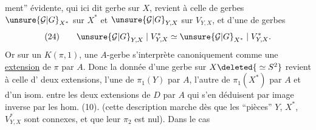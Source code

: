 ment'' évidente, qui ici dit 
 gerbe 
sur $X$, revient à celle de gerbes $\unsure{\mathcal G|G}_{X^*}$ sur
$X^*$ et $\unsure{\mathcal G|G}_{Y,X}$ sur $V_{Y,X}$, et d'une
 de  gerbes
\[
(24)\qquad \unsure{\mathcal G|G}_{Y,X}\mid V^*_{Y,X}\simeq
\unsure{\mathcal G|G}_{X^*}\mid V^*_{Y,X}.
\]
Or sur un $K(\pi,1)$, une $A$-gerbe
s'interprète canoniquement comme une
\uline{extension} de $\pi$ par $A$. Donc la donnée
d'une gerbe sur $X\deleted{{}\simeq S^2}$ revient à celle
d' deux extensions, l'une de
$\pi_1(Y)$ par $A$, l'autre de $\pi_1(X^*)$ par $A$
et d'un isom. entre les deux extensions
de $D$ par $A$ qui s'en déduisent
par image inverse par les hom. (10).
(cette description marche dès que les
``pièces'' $Y$, $X^*$, $V^*_{Y,X}$ sont connexes, et
que leur $\pi_2$ est nul). Dans le cas
